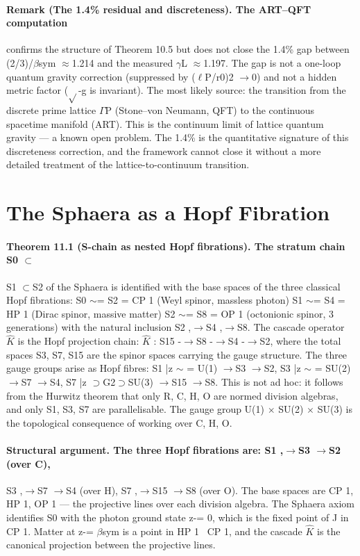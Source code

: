 \paragraph*{Remark (The 1.4\% residual and discreteness). The ART--QFT computation}
confirms the structure of Theorem 10.5 but does not close the 1.4\% gap between (2/3)/$\beta$sym $\approx$1.214 and the measured $\gamma$L $\approx$1.197. The gap is not a one-loop
quantum gravity correction (suppressed by ($\ell$P/r0)2 $\to$0) and not a hidden metric factor ($\sqrt{}$-g is invariant). The most likely source: the transition from the discrete prime lattice $\Gamma$P (Stone--von Neumann, QFT) to the continuous spacetime manifold (ART). This is the continuum limit of lattice quantum gravity --- a known open problem. The 1.4\% is the quantitative signature of this discreteness correction, and the framework cannot close it without a more detailed treatment of the lattice-to-continuum transition.

\section{The Sphaera as a Hopf Fibration}
\paragraph*{Theorem 11.1 (S-chain as nested Hopf fibrations). The stratum chain S0 $\subset$}
S1 $\subset$S2 of the Sphaera is identified with the base spaces of the three classical Hopf fibrations: S0 $\sim$= S2 = CP 1 (Weyl spinor, massless photon) S1 $\sim$= S4 = HP 1 (Dirac spinor, massive matter) S2 $\sim$= S8 = OP 1 (octonionic spinor, 3 generations) with the natural inclusion S2 ,$\to$S4 ,$\to$S8. The cascade operator $\hat K$ is the Hopf projection chain: $\hat K$ : S15 -$\to$S8 -$\to$S4 -$\to$S2, where the total spaces S3, S7, S15 are the spinor spaces carrying the gauge structure. The three gauge groups arise as Hopf fibres: S1 |{z} $\sim$ = U(1) $\to$S3 $\to$S2, S3 |{z} $\sim$ = SU(2) $\to$S7 $\to$S4, S7 |{z} $\supset$G2$\supset$SU(3) $\to$S15 $\to$S8. This is not ad hoc: it follows from the Hurwitz theorem that only R, C, H, O are normed division algebras, and only S1, S3, S7 are parallelisable. The gauge group U(1) $\times$ SU(2) $\times$ SU(3) is the topological consequence of working over C, H, O.
\paragraph*{Structural argument. The three Hopf fibrations are: S1 ,$\to$S3 $\to$S2 (over C),}
S3 ,$\to$S7 $\to$S4 (over H), S7 ,$\to$S15 $\to$S8 (over O). The base spaces are CP 1, HP 1, OP 1 --- the projective lines over each division algebra. The Sphaera axiom identifies S0 with the photon ground state z-= 0, which is the fixed point of J in CP 1. Matter at z-= $\beta$sym is a point in HP 1 \ CP 1, and the cascade $\hat K$ is the canonical projection between the projective lines.
